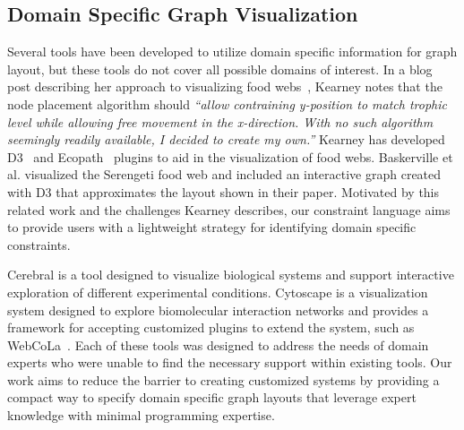 
\subsection{Domain Specific Graph Visualization}
Several tools have been developed to utilize domain specific information for graph layout, but these tools do not cover all possible domains of interest. In a blog post describing her approach to visualizing food webs~\cite{kearney2016blog}, Kearney notes that the node placement algorithm should \emph{``allow contraining y-position to match trophic level while allowing free movement in the x-direction. With no such algorithm seemingly readily available, I decided to create my own.''} Kearney has developed D3~\cite{kearney2017d3} and Ecopath~\cite{kearney2017ecopath} plugins to aid in the visualization of food webs. Baskerville et al. \cite{baskerville2011spatial} visualized the Serengeti food web and included an interactive graph \cite{baskerville2011interactive} created with D3 that approximates the layout shown in their paper. Motivated by this related work and the challenges Kearney describes, our constraint language aims to provide users with a lightweight strategy for identifying domain specific constraints.

Cerebral \cite{barsky2008cerebral} is a tool designed to visualize biological systems and support interactive exploration of different experimental conditions. Cytoscape \cite{shannon2003cytoscape} is a visualization system designed to explore biomolecular interaction networks and provides a framework for accepting customized plugins to extend the system, such as WebCoLa~\cite{WebCoLa}. Each of these tools was designed to address the needs of domain experts who were unable to find the necessary support within existing tools. Our work aims to reduce the barrier to creating customized systems by providing a compact way to specify domain specific graph layouts that leverage expert knowledge with minimal programming expertise.





